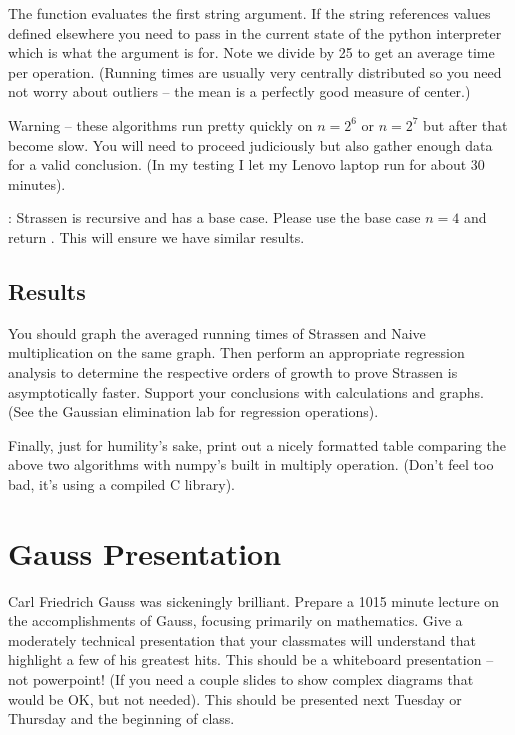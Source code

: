 \documentclass[letterpaper,10pt,english]{jupyterBook}
\begin{document}
\sphinxAtStartPar
The  function evaluates the first string argument. If the string references
values defined elsewhere you need to pass in the current state of the python interpreter
which is what the  argument is for. Note we divide by 25 to get an average time per operation. (Running times are usually very centrally distributed so you need not worry about outliers – the mean is a perfectly good measure of center.)

\sphinxAtStartPar
Warning – these algorithms run pretty quickly on \(n=2^6\) or \(n=2^7\) but after that become  slow. You will need to proceed judiciously but also gather enough data for a valid conclusion. (In my testing I let my Lenovo laptop run for about 30 minutes).

\sphinxAtStartPar
{}: Strassen is recursive and has a base case. Please use the base case \(n=4\) and return . This will ensure we have similar results.


\section{Results}
\label{\detokenize{lessons/Strassen-Lab:results}}
\sphinxAtStartPar
You should graph the averaged running times of Strassen and Naive multiplication on the same graph. Then perform an appropriate regression analysis to determine the respective orders of growth to prove Strassen is asymptotically faster. Support your conclusions with calculations and graphs. (See the Gaussian elimination lab for regression operations).

\sphinxAtStartPar
Finally, just for humility’s sake, print out a nicely formatted table comparing the above two algorithms with numpy’s built in multiply operation. (Don’t feel too bad, it’s using a compiled C library).

\sphinxstepscope


\chapter{Gauss Presentation}
\label{\detokenize{lessons/Gauss:gauss-presentation}}\label{\detokenize{lessons/Gauss::doc}}
\sphinxAtStartPar
Carl Friedrich Gauss was sickeningly brilliant. Prepare a 10\sphinxhyphen{}15 minute lecture on the
accomplishments of Gauss, focusing primarily on mathematics. Give a moderately technical presentation that your classmates will understand that highlight a few of his greatest hits. This should be a whiteboard presentation – not powerpoint! (If you need a couple slides to show complex diagrams that would be OK, but not needed). This should be presented next Tuesday or Thursday and the beginning of class.
\end{document}
